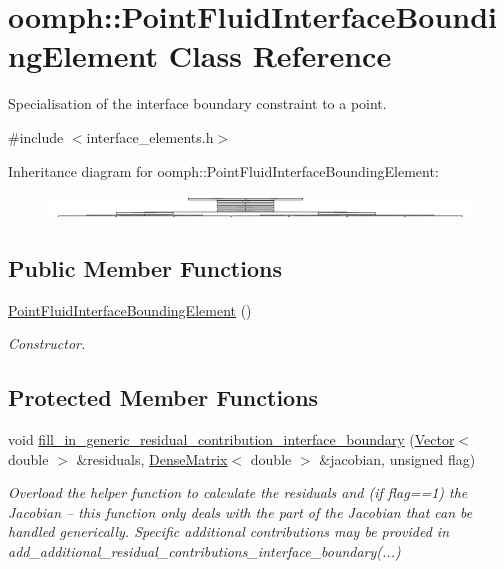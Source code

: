 \hypertarget{classoomph_1_1PointFluidInterfaceBoundingElement}{}\section{oomph\+:\+:Point\+Fluid\+Interface\+Bounding\+Element Class Reference}
\label{classoomph_1_1PointFluidInterfaceBoundingElement}


Specialisation of the interface boundary constraint to a point.  




{\ttfamily \#include $<$interface\+\_\+elements.\+h$>$}

Inheritance diagram for oomph\+:\+:Point\+Fluid\+Interface\+Bounding\+Element\+:\begin{figure}[H]
\begin{center}
\leavevmode
\includegraphics[height=0.655738cm]{classoomph_1_1PointFluidInterfaceBoundingElement}
\end{center}
\end{figure}
\subsection*{Public Member Functions}
\begin{DoxyCompactItemize}
\item 
\hyperlink{classoomph_1_1PointFluidInterfaceBoundingElement_a920776d9680859c72f79d446a7c3d1e8}{Point\+Fluid\+Interface\+Bounding\+Element} ()
\begin{DoxyCompactList}\small\item\em Constructor. \end{DoxyCompactList}\end{DoxyCompactItemize}
\subsection*{Protected Member Functions}
\begin{DoxyCompactItemize}
\item 
void \hyperlink{classoomph_1_1PointFluidInterfaceBoundingElement_aad95a7d6f4e4349ee1136e623aa69c88}{fill\+\_\+in\+\_\+generic\+\_\+residual\+\_\+contribution\+\_\+interface\+\_\+boundary} (\hyperlink{classoomph_1_1Vector}{Vector}$<$ double $>$ \&residuals, \hyperlink{classoomph_1_1DenseMatrix}{Dense\+Matrix}$<$ double $>$ \&jacobian, unsigned flag)
\begin{DoxyCompactList}\small\item\em Overload the helper function to calculate the residuals and (if flag==1) the Jacobian -- this function only deals with the part of the Jacobian that can be handled generically. Specific additional contributions may be provided in add\+\_\+additional\+\_\+residual\+\_\+contributions\+\_\+interface\+\_\+boundary(...) \end{DoxyCompactList}\end{DoxyCompactItemize}
